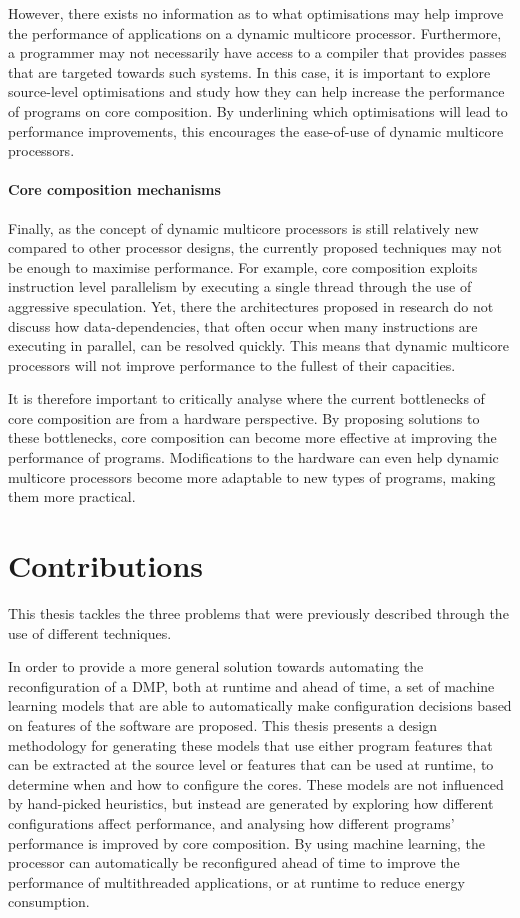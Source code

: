 However, there exists no information as to what optimisations may help improve the performance of applications on a dynamic multicore processor.
Furthermore, a programmer may not necessarily have access to a compiler that provides passes that are targeted towards such systems.
In this case, it is important to explore source-level optimisations and study how they can help increase the performance of programs on core composition.
By underlining which optimisations will lead to performance improvements, this encourages the ease-of-use of dynamic multicore processors.

\paragraph*{Core composition mechanisms} 
Finally, as the concept of dynamic multicore processors is still relatively new compared to other processor designs, the currently proposed techniques may not be enough to maximise performance.
For example, core composition exploits instruction level parallelism by executing a single thread through the use of aggressive speculation.
Yet, there the architectures proposed in research do not discuss how data-dependencies, that often occur when many instructions are executing in parallel, can be resolved quickly.
This means that dynamic multicore processors will not improve performance to the fullest of their capacities.

It is therefore important to critically analyse where the current bottlenecks of core composition are from a hardware perspective.
By proposing solutions to these bottlenecks, core composition can become more effective at improving the performance of programs.
Modifications to the hardware can even help dynamic multicore processors become more adaptable to new types of programs, making them more practical.


\section{Contributions}
This thesis tackles the three problems that were previously described through the use of different techniques.

In order to provide a more general solution towards automating the reconfiguration of a DMP, both at runtime and ahead of time, a set of machine learning models that are able to automatically make configuration decisions based on features of the software are proposed.
This thesis presents a design methodology for generating these models that use either program features that can be extracted at the source level or features that can be used at runtime, to determine when and how to configure the cores.
These models are not influenced by hand-picked heuristics, but instead are generated by exploring how different configurations affect performance, and analysing how different programs' performance is improved by core composition.
By using machine learning, the processor can automatically be reconfigured ahead of time to improve the performance of multithreaded applications, or at runtime to reduce energy consumption.

